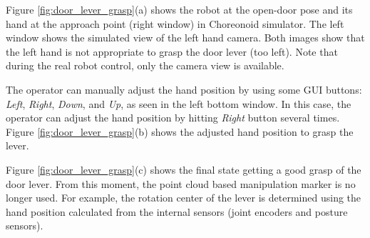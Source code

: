 Figure \ref{fig:door_lever_grasp}(a) shows the robot at the open-door pose and its hand at the
approach point (right window) in Choreonoid simulator.
The left window shows the simulated view of the left hand camera.
Both images show that the left hand is not appropriate to grasp the door lever (too left).
Note that during the real robot control, only the camera view is available. 

The operator can manually adjust the hand position by using some GUI buttons: 
{\it Left}, {\it Right}, {\it Down}, and {\it Up}, as seen in the left bottom window.
In this case, the operator can adjust the hand position by hitting {\it Right} button
several times.
Figure \ref{fig:door_lever_grasp}(b) shows the adjusted hand position to grasp the lever.

Figure \ref{fig:door_lever_grasp}(c) shows the final state getting a good grasp of the door lever.
From this moment, the point cloud based manipulation marker is no longer used.
For example, the rotation center of the lever is determined using the hand position calculated from
the internal sensors (joint encoders and posture sensors). 
%
